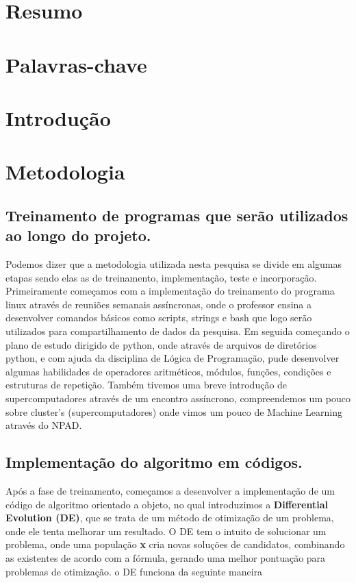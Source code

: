 \documentclass[a4paper, 12pt]{article}
\begin{document}
\maketitle

\section{Resumo}

\section{Palavras-chave}

\section{Introdução}

\section{Metodologia}

\subsection{Treinamento de programas que serão utilizados ao longo do projeto.}

 Podemos dizer que a metodologia utilizada nesta pesquisa se divide em algumas etapas sendo elas as de treinamento, implementação, teste e incorporação.
 Primeiramente começamos com a implementação do treinamento do programa linux através de reuniões semanais assíncronas, onde o professor ensina a desenvolver  comandos básicos como scripts, strings e bash que logo serão utilizados para compartilhamento de dados da pesquisa.
  Em seguida começando o plano de estudo dirigido de python, onde através de arquivos de diretórios python, e com ajuda da disciplina de Lógica de Programação, pude desenvolver algumas habilidades de operadores aritméticos, módulos, funções, condições e estruturas de repetição.
  Também tivemos uma breve introdução de supercomputadores através de um encontro assíncrono, compreendemos um pouco sobre cluster’s (supercomputadores) onde vimos um pouco de Machine Learning através do NPAD.

\subsection{Implementação do algoritmo em códigos.}

 Após a fase de treinamento, começamos a desenvolver a implementação de um código de algoritmo orientado a objeto, no qual introduzimos a \textbf{Differential Evolution (DE)}, que se trata de um método de otimização de um problema, onde ele tenta melhorar um resultado. O DE tem o intuito de solucionar um problema, onde uma população \textbf{x} cria novas soluções de candidatos, combinando as existentes de acordo com a fórmula, gerando uma melhor pontuação para problemas de otimização.
 o DE funciona da seguinte maneira 
\end{document}
